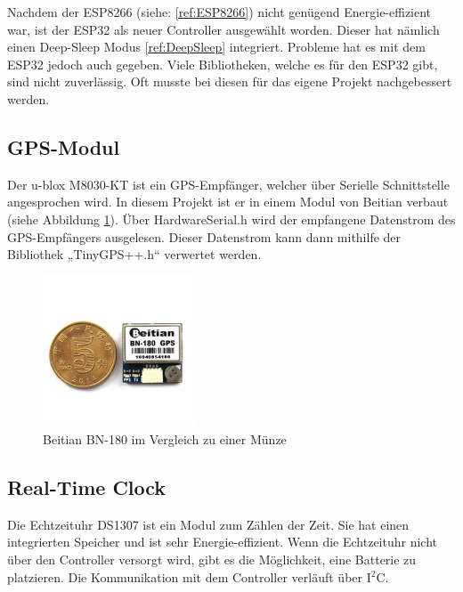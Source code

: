     Nachdem der ESP8266 (siehe: \ref{ref:ESP8266}) nicht genügend Energie-effizient war,  ist der ESP32 als neuer Controller ausgewählt worden. Dieser hat nämlich einen Deep-Sleep Modus \ref{ref:DeepSleep} integriert. Probleme hat es mit dem ESP32 jedoch auch gegeben. Viele Bibliotheken, welche es für den ESP32 gibt, sind nicht zuverlässig. Oft musste bei diesen für das eigene Projekt nachgebessert werden. 
    
\pagebreak

\subsection{GPS-Modul}\label{ref:Beitian}

    Der u-blox M8030-KT ist ein GPS-Empfänger, welcher über Serielle Schnittstelle angesprochen wird. In diesem Projekt ist er in einem Modul von Beitian verbaut (siehe Abbildung \ref{fig:Beitian}). Über HardwareSerial.h wird der empfangene Datenstrom des GPS-Empfängers ausgelesen. Dieser Datenstrom kann dann mithilfe der Bibliothek „TinyGPS++.h“ verwertet werden.
    
    \begin{figure}[H]
        \centering
        \includegraphics[width=0.4\textwidth]{./media/images/GPS.jpg}
        \caption{Beitian BN-180 im Vergleich zu einer Münze \cite{bib:Beitian}}
        \label{fig:Beitian}
    \end{figure}
    
\subsection{Real-Time Clock}\label{ref:RTC}

    Die Echtzeituhr DS1307 ist ein Modul zum Zählen der Zeit. Sie hat einen integrierten Speicher und ist sehr Energie-effizient. Wenn die Echtzeituhr nicht über den Controller versorgt wird, gibt es die Möglichkeit, eine Batterie zu platzieren. Die Kommunikation mit dem Controller verläuft über I$^2$C.  


